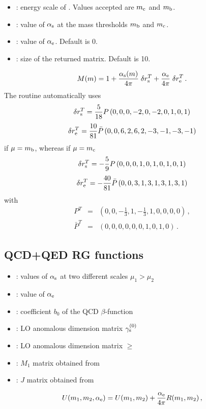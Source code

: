 \begin{itemize}
\item {}: energy scale of . Values accepted are $m_{\mathrm c}$ and $m_{\mathrm b}$.
\item {}: value of $\alpha_{\rm s}$ at the mass thresholds $m_{\mathrm b}$ and $m_{\mathrm c}$.
\item {}: value of $\alpha_{\rm e}$. Default is 0.
\item {}: size of the returned matrix. Default is 10.
\end{itemize}

\begin{equation}
M(m) = 1 + \frac{\alpha_{\rm s}(m)}{4\pi} \; \delta r_{\rm s}^T +
         \frac{\alpha_{\rm e}}{4\pi} \; \delta r_{\rm e}^T \, .
\label{eq:MmdF1:1010}
\end{equation}
The routine automatically uses
\begin{equation}\nonumber
\delta r_{\rm s}^T=\frac{5}{18} P \, (0,0,0,-2,0,-2,0,1,0,1)
\end{equation}
\begin{equation}
\delta r_{\rm e}^T=\frac{10}{81} \bar{P} \, (0,0,6,2,6,2,-3,-1,-3,-1)
\label{eq:drsembdF1:1010}
\end{equation}
if $\mu=m_{\mathrm b}$, whereas if  $\mu=m_{\mathrm c}$
\begin{equation}\nonumber
\delta r_{\rm s}^T=-\frac{5}{9} P \, (0,0,0,1,0,1,0,1,0,1)
\end{equation}
\begin{equation}
\delta r_{\rm e}^T=-\frac{40}{81} \bar{P} \, (0,0,3,1,3,1,3,1,3,1)
\label{eq:drsemcdF1:1010}
\end{equation}
with 
\begin{eqnarray}
P^T &=& (0,0,-\frac{1}{3},1,-\frac{1}{3},1,0,0,0,0) \, ,
\label{eq:Pdrs:10} \\
\bar{P}^T &=& (0,0,0,0,0,0,1,0,1,0) \, .
\label{eq:Pbardre:10}
\end{eqnarray}


\subsection{QCD+QED RG functions}


\begin{itemize}
\item {}: values of $\alpha_{\rm s}$ at two different scales $\mu_1>\mu_2$
\item {}: value of $\alpha_{\rm e}$
\item {}: coefficient $b_0$ of the QCD $\beta$-function
\item {}: LO anomalous dimension matrix $\gamma_{\rm s}^{(0)}$
\item {}: LO anomalous dimension matrix $\ge$
\item {}: $M_1$ matrix obtained from 
\item {}: $J$ matrix obtained from 
\end{itemize}

\begin{equation}
U(m_1,m_2,\alpha_{\rm e}) =
U(m_1,m_2) + \frac{\alpha_{\rm e}}{4\pi} R(m_1,m_2) \, ,
\label{eq:UdF1:1010}
\end{equation}

